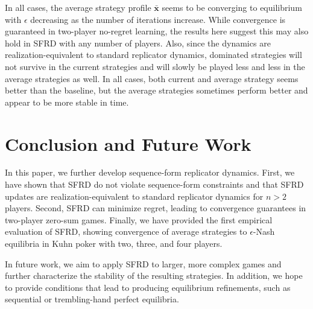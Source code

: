 \documentclass{aamas2014}
\newcommand{\bx}{\mathbf{x}}
\begin{document}
In all cases, the average strategy profile $\bar{\bx}$ seems to be converging to equilibrium with $\epsilon$ decreasing as the
number of iterations increase. 
While convergence is guaranteed in two-player no-regret learning, the results here suggest this may also hold in SFRD with 
any number of players.  
Also, since the dynamics are realization-equivalent to standard replicator dynamics, dominated strategies will not survive 
in the current strategies and will slowly be played less and less in the average strategies as well. 
In all cases, both current and average strategy seems better than the baseline, but the average strategies sometimes perform 
better and appear to be more stable in time. 

\section{Conclusion and Future Work}

In this paper, we further develop sequence-form replicator dynamics. 
First, we have shown that SFRD do not violate sequence-form constraints and
that SFRD updates are realization-equivalent to standard replicator dynamics
for $n > 2$ players. Second, SFRD can minimize regret, leading to 
convergence guarantees in two-player zero-sum games. Finally, we have provided
the first empirical evaluation of SFRD, showing convergence of average strategies 
to $\epsilon$-Nash equilibria in Kuhn poker with two, three, and four players.  

In future work, we aim to apply SFRD to larger, more complex games and further characterize the stability of the resulting strategies. 
In addition, we hope to provide conditions that lead to producing equilibrium refinements, 
such as sequential or trembling-hand perfect equilibria. 


%

%
%
\end{document}
